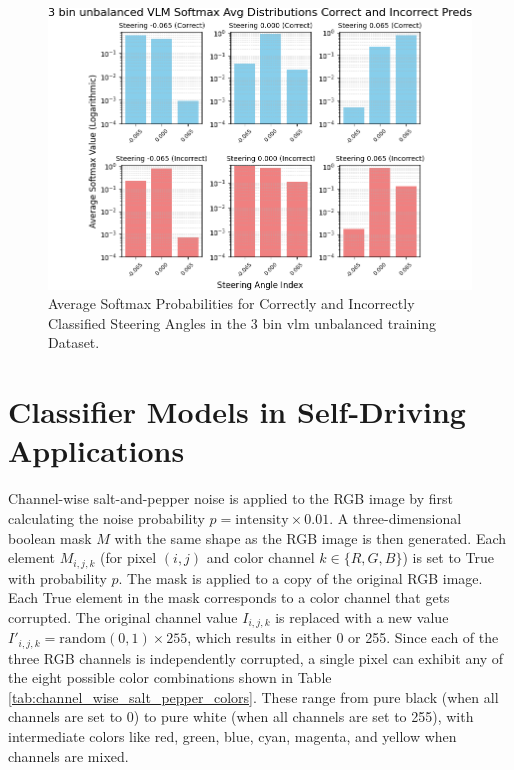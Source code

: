 \begin{figure}[H]
    \centering
    \includegraphics[width=1\linewidth]{Figures/Results/3_bins_vlm_softmax_dist_plot_unbalanced.png}
    \caption{Average Softmax Probabilities for Correctly and Incorrectly Classified Steering Angles in the 3 bin vlm unbalanced training Dataset.}
    \label{fig:3_bins_vlm_softmax_dist_unbalanced}
\end{figure}


\section{Classifier Models in Self-Driving Applications}

Channel-wise salt-and-pepper noise is applied to the RGB image by first calculating the noise probability $p = \text{intensity} \times 0.01$. A three-dimensional boolean mask $M$ with the same shape as the RGB image is then generated. Each element $M_{i,j,k}$ (for pixel $(i,j)$ and color channel $k \in \{R,G,B\}$) is set to True with probability $p$. The mask is applied to a copy of the original RGB image. Each True element in the mask corresponds to a color channel that gets corrupted. The original channel value $I_{i,j,k}$ is replaced with a new value $I'_{i,j,k} = \text{random}(0,1) \times 255$, which results in either 0 or 255. Since each of the three RGB channels is independently corrupted, a single pixel can exhibit any of the eight possible color combinations shown in Table \ref{tab:channel_wise_salt_pepper_colors}. These range from pure black (when all channels are set to 0) to pure white (when all channels are set to 255), with intermediate colors like red, green, blue, cyan, magenta, and yellow when channels are mixed.

